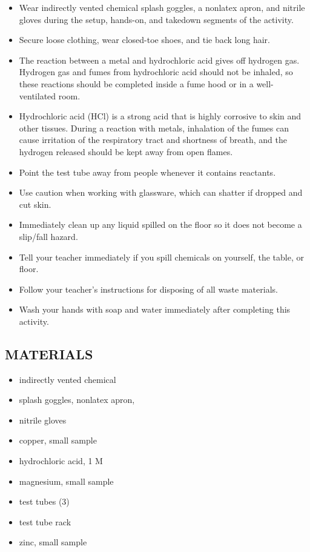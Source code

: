\documentclass[a4paper,12pt]{exam}
\begin{document}
\begin{itemize}
\item Wear indirectly vented chemical splash goggles, a nonlatex apron, and nitrile gloves during the setup, hands-on, and takedown segments of the activity.

\item Secure loose clothing, wear closed-toe shoes, and tie back long hair.

\item The reaction between a metal and hydrochloric acid gives off hydrogen gas. Hydrogen gas and fumes from hydrochloric acid should not be inhaled, so these reactions should be completed inside a fume hood or in a well-ventilated room.

\item Hydrochloric acid (HCl) is a strong acid that is highly corrosive to skin and other tissues. During a reaction with metals, inhalation of the fumes can cause irritation of the respiratory tract and shortness of breath, and the hydrogen released should be kept away from open flames.

\item  Point the test tube away from people whenever it contains reactants.

\item Use caution when working with glassware, which can shatter if dropped and cut skin.

\item Immediately clean up any liquid spilled on the floor so it does not become a slip/fall hazard.

\item Tell your teacher immediately if you spill chemicals on yourself, the table, or floor.

\item Follow your teacher's instructions for disposing of all waste materials.

\item Wash your hands with soap and water immediately after completing this activity.

\end{itemize}

 \subsection*{MATERIALS}

 \begin{itemize}
    \item  indirectly vented chemical
    \item splash goggles, nonlatex apron,
    \item nitrile gloves
    \item copper, small sample
    \item hydrochloric acid, 1 M
    \item magnesium, small sample
    \item test tubes (3)
    \item test tube rack
    \item zinc, small sample
\end{itemize}
\end{document}
